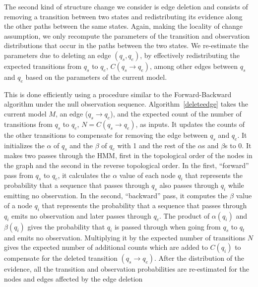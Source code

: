 \documentclass[letterpaper]{article}
\begin{document}



The second kind of structure change we consider is edge deletion and consists of removing a transition between two states and
redistributing its evidence along the other paths between the same states.
Again, making the locality of change assumption, we only recompute
the parameters of the transition and observation distributions
that occur in the paths between the two states.
We re-estimate the parameters due to deleting an edge $(q_s,q_e)$,
by effectively redistributing the expected transitions from
$q_s$ to $q_e$, $C(q_s \rightarrow q_e)$,
among other edges between $q_s$ and $q_e$ based on the parameters of the current model.

This is done efficiently using a procedure similar to the
Forward-Backward algorithm under the null observation sequence.
Algorithm~\ref{deleteedge} takes the current model $M$, an edge
($q_s \rightarrow q_e$), and the expected count of the number of transitions
from $q_s$ to $q_e$, $N = C(q_s \rightarrow q_e)$,
as inputs. It updates the counts of
the other transitions to compensate for removing the edge between
$q_s$ and $q_e$. It initializes the $\alpha$ of $q_s$ and the $\beta$
of $q_e$ with 1 and the rest of the $\alpha$s and $\beta$s to $0$.
It makes two passes through the HMM,
first in the topological order of the nodes in the graph and the second
in the reverse topological order. In the first, ``forward'' pass
from $q_s$ to $q_e$,
it calculates  the $\alpha$ value of each node $q_i$
that represents the probability that a sequence that
passes through $q_s$ also passes through $q_i$
while emitting no observation. In the second, ``backward'' pass,
it computes the $\beta$ value of a node $q_i$
that represents the probability that a sequence that passes
through
$q_i$ emits no observation and later
passes through $q_e$. The product of
$\alpha(q_i)$ and $\beta(q_i)$ gives the probability that
$q_i$ is passed through when going from $q_s$ to $q_t$ and emits
no observation. Multiplying it by the
expected number of transitions $N$ gives the
expected number of additional counts %
which are added to $C(q_i)$
to compensate for the deleted transition $(q_s \rightarrow q_e)$.
After the distribution of the evidence,
all the transition and observation probabilities are re-estimated for
the nodes and edges affected by the edge deletion
\end{document}

